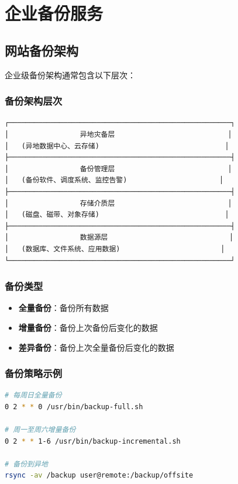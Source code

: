 \documentclass[12pt,UTF8]{ctexbook}
\begin{document}
\chapter{企业备份服务}
\label{chap:backup-services}

\section{网站备份架构}
\label{sec:backup-arch}

企业级备份架构通常包含以下层次：

\subsection*{备份架构层次}
\begin{lstlisting}
┌─────────────────────────────────────────────────────┐
│                 异地灾备层                           │
│   (异地数据中心、云存储)                              │
├─────────────────────────────────────────────────────┤
│                 备份管理层                           │
│   (备份软件、调度系统、监控告警)                      │
├─────────────────────────────────────────────────────┤
│                 存储介质层                           │
│   (磁盘、磁带、对象存储)                              │
├─────────────────────────────────────────────────────┤
│                 数据源层                             │
│   (数据库、文件系统、应用数据)                        │
└─────────────────────────────────────────────────────┘
\end{lstlisting}

\subsection*{备份类型}
\begin{itemize}
    \item \textbf{全量备份}：备份所有数据
    \item \textbf{增量备份}：备份上次备份后变化的数据
    \item \textbf{差异备份}：备份上次全量备份后变化的数据
\end{itemize}

\subsection*{备份策略示例}
\begin{lstlisting}[language=bash]
# 每周日全量备份
0 2 * * 0 /usr/bin/backup-full.sh

# 周一至周六增量备份
0 2 * * 1-6 /usr/bin/backup-incremental.sh

# 备份到异地
rsync -av /backup user@remote:/backup/offsite
\end{lstlisting}
\end{document}
